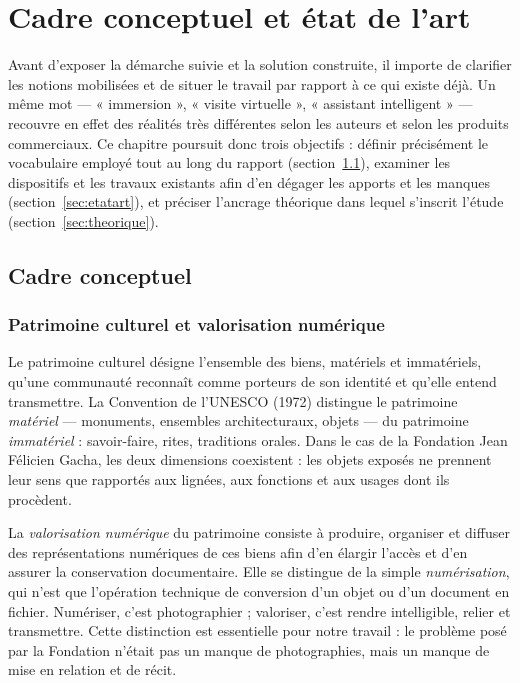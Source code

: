 \chapter{Cadre conceptuel et état de l'art}
\label{chap:cadre}

\introchap

Avant d'exposer la démarche suivie et la solution construite, il importe de
clarifier les notions mobilisées et de situer le travail par rapport à ce qui
existe déjà. Un même mot — « immersion », « visite virtuelle », « assistant
intelligent » — recouvre en effet des réalités très différentes selon les
auteurs et selon les produits commerciaux. Ce chapitre poursuit donc trois
objectifs : définir précisément le vocabulaire employé tout au long du rapport
(section~\ref{sec:conceptuel}), examiner les dispositifs et les travaux
existants afin d'en dégager les apports et les manques
(section~\ref{sec:etatart}), et préciser l'ancrage théorique dans lequel
s'inscrit l'étude (section~\ref{sec:theorique}).

\section{Cadre conceptuel}
\label{sec:conceptuel}

\subsection{Patrimoine culturel et valorisation numérique}

Le patrimoine culturel désigne l'ensemble des biens, matériels et immatériels,
qu'une communauté reconnaît comme porteurs de son identité et qu'elle entend
transmettre. La Convention de l'UNESCO (1972) distingue le patrimoine
\emph{matériel} — monuments, ensembles architecturaux, objets — du patrimoine
\emph{immatériel} : savoir-faire, rites, traditions orales. Dans le cas de la
Fondation Jean Félicien Gacha, les deux dimensions coexistent : les objets
exposés ne prennent leur sens que rapportés aux lignées, aux fonctions et aux
usages dont ils procèdent.

La \emph{valorisation numérique} du patrimoine consiste à produire, organiser et
diffuser des représentations numériques de ces biens afin d'en élargir l'accès
et d'en assurer la conservation documentaire. Elle se distingue de la simple
\emph{numérisation}, qui n'est que l'opération technique de conversion d'un
objet ou d'un document en fichier. Numériser, c'est photographier ; valoriser,
c'est rendre intelligible, relier et transmettre. Cette distinction est
essentielle pour notre travail : le problème posé par la Fondation n'était pas
un manque de photographies, mais un manque de mise en relation et de récit.

